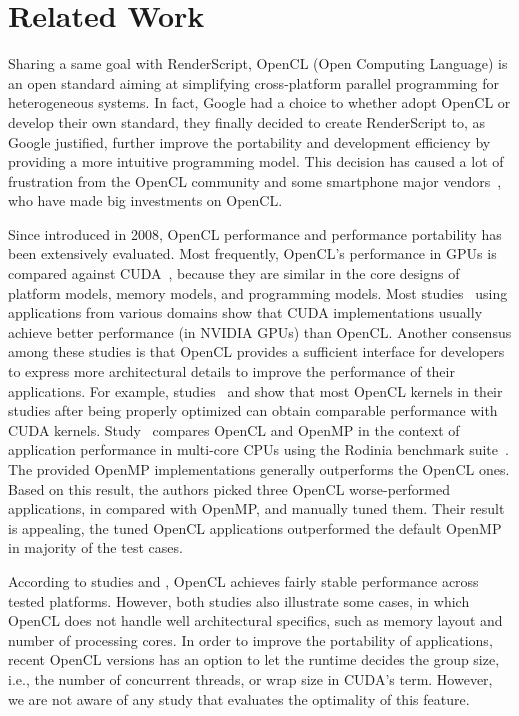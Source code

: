 \section{Related Work}

Sharing a same goal with RenderScript, OpenCL (Open Computing Language)
\cite{OpenCL} is an open standard aiming at simplifying cross-platform
parallel programming for heterogeneous systems. In fact, Google had a choice to
whether adopt OpenCL or develop their own standard, they finally decided to
create RenderScript to, as Google justified, further improve the
portability and development efficiency by providing a more intuitive programming
model. This decision has caused a lot of frustration from the OpenCL community
\cite{androidblockopenCL} and some smartphone major vendors~\cite{googlelockin},
who have made big investments on OpenCL.

Since introduced in 2008, OpenCL performance and performance portability has
been extensively evaluated. Most frequently, OpenCL's performance in GPUs is
compared against CUDA~\cite{fang2011comprehensive, weber2011comparing,
van2011correlating, vassilev2010comparison, amorim2009comparing,
karimi2010performance, komatsu2010evaluating}, because they are similar in the
core designs of platform models, memory models, and programming models.  Most
studies~\cite{weber2011comparing, van2011correlating, vassilev2010comparison,
amorim2009comparing} using applications from various domains show that
CUDA implementations usually achieve better performance (in NVIDIA GPUs) than
OpenCL. Another consensus among these studies is that OpenCL provides a sufficient
interface for developers to express more architectural details to improve the
performance of their applications. For example,
studies~\cite{komatsu2010evaluating} and \cite{fang2011comprehensive} show that
most OpenCL kernels in their studies after being properly optimized can obtain
comparable performance with CUDA kernels.  Study~\cite{shen2012performance}
compares OpenCL and OpenMP in the context of application performance in
multi-core CPUs using the Rodinia benchmark suite~\cite{che2009rodinia}. The
provided OpenMP implementations generally outperforms the OpenCL ones.
Based on this result, the authors picked three OpenCL worse-performed
applications, in compared with OpenMP, and manually tuned them.  Their
result is appealing, the tuned OpenCL applications outperformed the default
OpenMP in majority of the test cases.

According to studies \cite{komatsu2010evaluating} and \cite{dolbeau2013one},
OpenCL achieves fairly stable performance across tested platforms. However, both
studies also illustrate some cases, in which OpenCL does not handle
well architectural specifics, such as memory layout and number of processing
cores. In order to improve the portability of applications, recent OpenCL
versions has an option to let the runtime decides the group size, i.e., the
number of concurrent threads, or wrap size in CUDA's term. However, we are not
aware of any study that evaluates the optimality of this feature.

